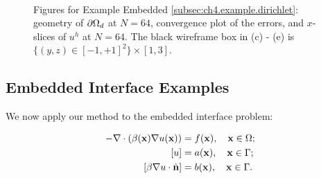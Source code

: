 \setlength{\figureheighti}{0.40\columnwidth}
\setlength{\figurewidthii}{0.32\columnwidth}
\begin{figure}[htbp]
\begin{center}
 \\
\caption{Figures for Example Embedded \ref{subsec:ch4.example.dirichlet}: geometry of $\partial\Omega_d$ at $N = 64$, convergence plot of the errors, and $x$-slices of $u^h$ at $N = 64$. The black wireframe box in (c) - (e) is $\{(y,z) \in [-1,+1]^2\} \times [1,3]$.}
\label{fig:ch4.examples.dirichlet}
\end{center}
\end{figure}

\subsection{Embedded Interface Examples} \label{subsec:ch4.examples.interface}

We now apply our method to the embedded interface problem:

\begin{align*}
-\nabla \cdot \left( \beta(\mathbf{x}) \nabla u(\mathbf{x}) \right) & = f(\mathbf{x}), \quad \mathbf{x} \in \Omega; \\
\left[ u \right] & = a(\mathbf{x}), \quad \mathbf{x} \in \Gamma; \\
\left[ \beta \nabla u \cdot \hat{\mathbf{n}} \right] & = b(\mathbf{x}), \quad \mathbf{x} \in \Gamma.
\end{align*}

